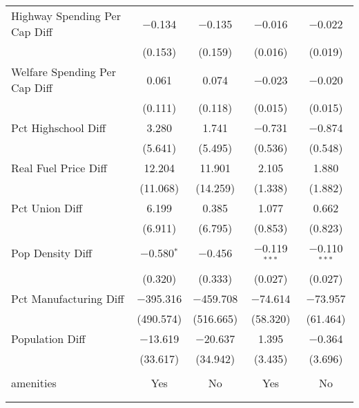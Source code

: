 \begin{table}[!htbp]
\begin{tabular}{@{\extracolsep{5pt}}lcccc}
  Highway Spending Per Cap Diff & $-$0.134 & $-$0.135 & $-$0.016 & $-$0.022 \\ 
  & (0.153) & (0.159) & (0.016) & (0.019) \\ 
  Welfare Spending Per Cap Diff & 0.061 & 0.074 & $-$0.023 & $-$0.020 \\ 
  & (0.111) & (0.118) & (0.015) & (0.015) \\ 
  Pct Highschool Diff & 3.280 & 1.741 & $-$0.731 & $-$0.874 \\ 
  & (5.641) & (5.495) & (0.536) & (0.548) \\ 
  Real Fuel Price Diff & 12.204 & 11.901 & 2.105 & 1.880 \\ 
  & (11.068) & (14.259) & (1.338) & (1.882) \\ 
  Pct Union Diff & 6.199 & 0.385 & 1.077 & 0.662 \\ 
  & (6.911) & (6.795) & (0.853) & (0.823) \\ 
  Pop Density Diff & $-$0.580$^{*}$ & $-$0.456 & $-$0.119$^{***}$ & $-$0.110$^{***}$ \\ 
  & (0.320) & (0.333) & (0.027) & (0.027) \\ 
  Pct Manufacturing Diff & $-$395.316 & $-$459.708 & $-$74.614 & $-$73.957 \\ 
  & (490.574) & (516.665) & (58.320) & (61.464) \\ 
  Population Diff & $-$13.619 & $-$20.637 & 1.395 & $-$0.364 \\ 
  & (33.617) & (34.942) & (3.435) & (3.696) \\ 
 \hline \\[-1.8ex] 
amenities & Yes & No & Yes & No \\ 
\hline \\[-1.8ex] 
\hline 
\hline \\[-1.8ex] 
\end{tabular} 
\end{table} 
